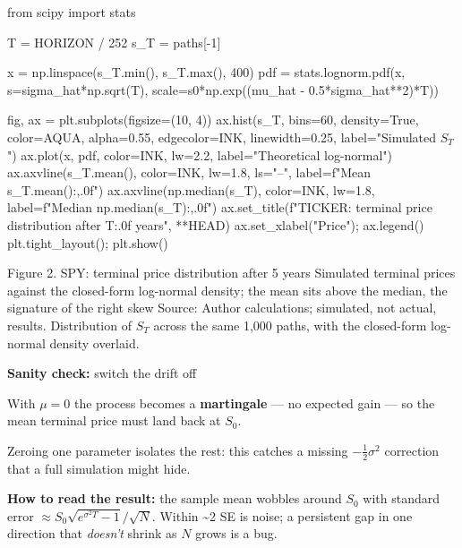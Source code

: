 \documentclass{pyportfolios-note}
\begin{document}
\begin{notecode}
from scipy import stats

T   = HORIZON / 252
s_T = paths[-1]

x   = np.linspace(s_T.min(), s_T.max(), 400)
pdf = stats.lognorm.pdf(x, s=sigma_hat*np.sqrt(T),
                        scale=s0*np.exp((mu_hat - 0.5*sigma_hat**2)*T))

fig, ax = plt.subplots(figsize=(10, 4))
ax.hist(s_T, bins=60, density=True, color=AQUA, alpha=0.55,
        edgecolor=INK, linewidth=0.25, label="Simulated $S_T$")
ax.plot(x, pdf, color=INK, lw=2.2, label="Theoretical log-normal")
ax.axvline(s_T.mean(),     color=INK, lw=1.8, ls="--", label=f"Mean   {s_T.mean():,.0f}")
ax.axvline(np.median(s_T), color=INK, lw=1.8,          label=f"Median {np.median(s_T):,.0f}")
ax.set_title(f"{TICKER}: terminal price distribution after {T:.0f} years", **HEAD)
ax.set_xlabel("Price"); ax.legend()
plt.tight_layout(); plt.show()
\end{notecode}

  {Figure 2. SPY: terminal price distribution after 5 years}
  {Simulated terminal prices against the closed-form log-normal density; the
   mean sits above the median, the signature of the right skew}
  {Source: Author calculations; simulated, not actual, results. Distribution of
   $S_T$ across the same 1,000 paths, with the closed-form log-normal density
   overlaid.}

\noteneedroom{190bp}
\begin{notebullets}
\item \textbf{Sanity check:} switch the drift off
      \begin{notesubbullets}
      \item With $\mu = 0$ the process becomes a \textbf{martingale} — no
            expected gain — so the mean terminal price must land back at $S_0$.
      \item Zeroing one parameter isolates the rest: this catches a missing
            $-\tfrac{1}{2}\sigma^2$ correction that a full simulation might hide.
      \item \textbf{How to read the result:} the sample mean wobbles around
            $S_0$ with standard error
            $\approx S_0\sqrt{e^{\sigma^2T}-1}\big/\sqrt{N}$. Within \textasciitilde2 SE
            is noise; a persistent gap in one direction that \textit{doesn't}
            shrink as $N$ grows is a bug.
      \end{notesubbullets}
\end{notebullets}
\end{document}
